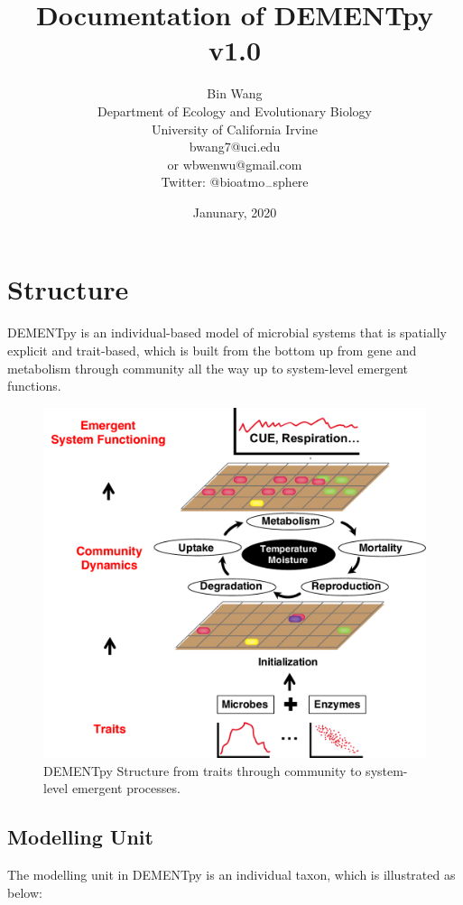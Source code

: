 \documentclass[12pt, oneside, titlepage]{article}      %
\title{\textbf{Documentation of DEMENTpy v1.0}}
\author{Bin Wang\\
Department of Ecology and Evolutionary Biology\\
University of California Irvine\\
bwang7@uci.edu\\
or wbwenwu@gmail.com\\
Twitter: {@bioatmo$\rule{2mm}{0.1mm}$sphere}}
\date{Janunary, 2020}
\begin{document}
\maketitle

\section{Structure}
DEMENTpy is an individual-based model of microbial systems that is spatially explicit and trait-based, which is built from the bottom up from gene and metabolism through community all the way up to system-level emergent functions.  

\begin{figure}[H]
  \centering
  \includegraphics[width=\linewidth]{figures/Fig1_Structure.pdf}
  \caption{DEMENTpy Structure from traits through community to system-level emergent processes.}
  \label{fig:structure}
\end{figure}

\subsection{Modelling Unit}
The modelling unit in DEMENTpy is an individual taxon, which is illustrated as below:

\end{document}
